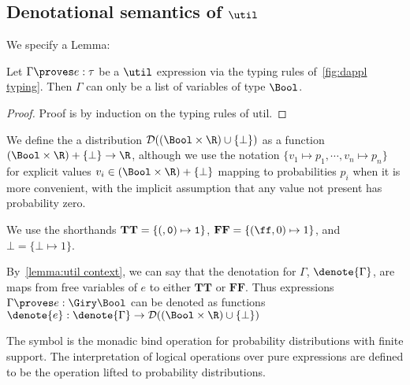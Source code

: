 \subsection{Denotational semantics of $\util$}\label{appendix:util semantics}

We specify a Lemma:

\begin{lemma}\label{lemma:util context}
  Let $\Gamma \proves e : \tau$ be a $\util$ expression via the typing rules 
  of~\cref{fig:dappl typing}. Then $\Gamma$ can only be a list of variables of
  type $\Bool$.
\end{lemma}

\begin{proof}
  Proof is by induction on the typing rules of util.
\end{proof}

We define the a distribution $\mathcal D((\Bool \times \R) \cup \{\bot\})$
as a function $(\Bool \times \R) + \{\bot\} \to \R$, although we use the notation
$\{v_1 \mapsto p_1, \cdots, v_n \mapsto p_n\}$ 
for explicit values $v_i \in (\Bool \times \R) + \{\bot\}$ mapping to probabilities $p_i$
when it is more convenient, with 
the implicit assumption that any value not present has probability zero.


We use the shorthands $\mathbf{TT} = \{(\tt,0) \mapsto 1\}$, $\mathbf{FF} = \{(\ff,0) \mapsto 1\}$, and
$\pmb{\bot} = \{\bot \mapsto 1\}$.

By~\cref{lemma:util context}, we can say that the denotation for $\Gamma$, $\denote{\Gamma}$, 
are maps from free variables of $e$ to either $\mathbf{TT}$ or $\mathbf{FF}$.
Thus expressions $\Gamma \proves e : \Giry \Bool$ can be denoted as
functions $\denote{e} : \denote{\Gamma} \to \mathcal D((\Bool \times \R) \cup \{\bot\})$

The symbol \fishbone is the monadic bind operation for probability distributions with
finite support. The interpretation of logical operations over pure expressions are 
defined to be the operation lifted to probability distributions.

